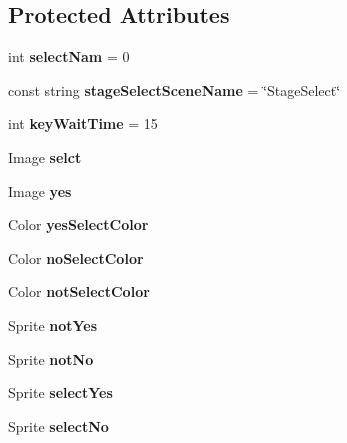 \subsection*{Protected Attributes}
\begin{DoxyCompactItemize}
\item 
\mbox{\label{class_next_select_a8073d689bf3461efe22d802ba17ba15f}} 
int {\bfseries select\+Nam} = 0
\item 
\mbox{\label{class_next_select_a5d5745c9d05d70753aa191b39eff0811}} 
const string {\bfseries stage\+Select\+Scene\+Name} = \char`\"{}Stage\+Select\char`\"{}
\item 
\mbox{\label{class_next_select_abf4f8e83c8353ce5ae1e3361f602afaa}} 
int {\bfseries key\+Wait\+Time} = 15
\item 
\mbox{\label{class_next_select_abce33edd033bfe6048c31652c6465a15}} 
Image {\bfseries selct}
\item 
\mbox{\label{class_next_select_a9137949075687635e52c92a2196dfda3}} 
Image {\bfseries yes}
\item 
\mbox{\label{class_next_select_acc7993fd85935d383414228036d94e87}} 
Color {\bfseries yes\+Select\+Color}
\item 
\mbox{\label{class_next_select_a41e1973222b2464ea2818974a3b88cb7}} 
Color {\bfseries no\+Select\+Color}
\item 
\mbox{\label{class_next_select_a862b27507ac6cc4f693639165202f263}} 
Color {\bfseries not\+Select\+Color}
\item 
\mbox{\label{class_next_select_aeb7188a2807b089a36fa81c71d57b369}} 
Sprite {\bfseries not\+Yes}
\item 
\mbox{\label{class_next_select_ad31a39811ccdfbdcae746f6df5486c27}} 
Sprite {\bfseries not\+No}
\item 
\mbox{\label{class_next_select_aa9b0315f9fd239bf8ac1c7b1fca000db}} 
Sprite {\bfseries select\+Yes}
\item 
\mbox{\label{class_next_select_a994d9946f5309df4d1c548e594d81066}} 
Sprite {\bfseries select\+No}
\end{DoxyCompactItemize}
